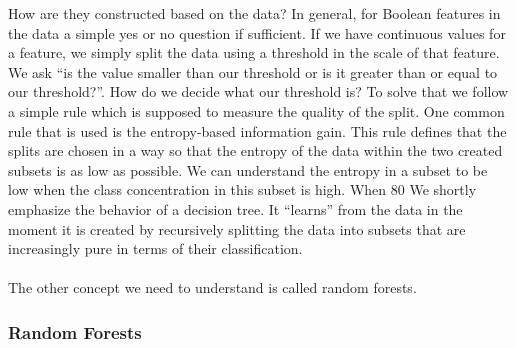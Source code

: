 \documentclass[a4paper,12pt]{report}
\begin{document}
	How are they constructed based on the data? In general, for Boolean features in the data a simple yes or no question if sufficient. If we have continuous values for a feature, we simply split the data using a threshold in the scale of that feature. We ask “is the value smaller than our threshold or is it greater than or equal to our threshold?”. How do we decide what our threshold is? To solve that we follow a simple rule which is supposed to measure the quality of the split. One common rule that is used is the entropy-based information gain. This rule defines that the splits are chosen in a way so that the entropy of the data within the two created subsets is as low as possible. We can understand the entropy in a subset to be low when the class concentration in this subset is high. When 80%
	We shortly emphasize the behavior of a decision tree. It “learns” from the data in the moment it is created by recursively splitting the data into subsets that are increasingly pure in terms of their classification. \\\\
	
	The other concept we need to understand is called random forests.
	
	\subsubsection{Random Forests}
	
\end{document}
